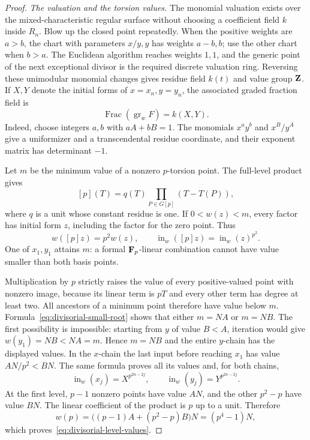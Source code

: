 \begin{proof}
\emph{The valuation and the torsion values.}
The monomial valuation exists over the mixed-characteristic regular surface without choosing a coefficient field $k$ inside $R_n$. Blow up the closed point repeatedly. When the positive weights are $a>b$, the chart with parameters $x/y,y$ has weights $a-b,b$; use the other chart when $b>a$. The Euclidean algorithm reaches weights $1,1$, and the generic point of the next exceptional divisor is the required discrete valuation ring. Reversing these unimodular monomial changes gives residue field $k(t)$ and value group $\mathbf Z$. If $X,Y$ denote the initial forms of $x=x_n,y=y_n$, the associated graded fraction field is
\begin{equation}\label{eq:divisorial-graded-field}
 \operatorname{Frac}(\operatorname{gr}_w F)=k(X,Y).
\end{equation}
Indeed, choose integers $a,b$ with $aA+bB=1$. The monomials $x^ay^b$ and $x^B/y^A$ give a uniformizer and a transcendental residue coordinate, and their exponent matrix has determinant $-1$.

Let $m$ be the minimum value of a nonzero $p$-torsion point. The full-level product gives
\[
 [p](T)=q(T)\prod_{P\in G[p]}(T-T(P)),
\]
where $q$ is a unit whose constant residue is one. If $0<w(z)<m$, every factor has initial form $z$, including the factor for the zero point. Thus
\begin{equation}\label{eq:divisorial-small-root}
 w([p]z)=p^2w(z),\qquad
 \operatorname{in}_w([p]z)=\operatorname{in}_w(z)^{p^2}.
\end{equation}
One of $x_1,y_1$ attains $m$: a formal $\mathbf F_p$-linear combination cannot have value smaller than both basis points.

Multiplication by $p$ strictly raises the value of every positive-valued point with nonzero image, because its linear term is $pT$ and every other term has degree at least two. All ancestors of a minimum point therefore have value below $m$. Formula~\eqref{eq:divisorial-small-root} shows that either $m=NA$ or $m=NB$. The first possibility is impossible: starting from $y$ of value $B<A$, iteration would give $w(y_1)=NB<NA=m$. Hence $m=NB$ and the entire $y$-chain has the displayed values. In the $x$-chain the last input before reaching $x_1$ has value $AN/p^2<BN$. The same formula proves all its values and, for both chains,
\[
 \operatorname{in}_w(x_j)=X^{p^{2n-2j}},
 \qquad \operatorname{in}_w(y_j)=Y^{p^{2n-2j}}.
\]
At the first level, $p-1$ nonzero points have value $AN$, and the other $p^2-p$ have value $BN$. The linear coefficient of the product is $p$ up to a unit. Therefore
\[
 w(p)=\bigl((p-1)A+(p^2-p)B\bigr)N=(p^4-1)N,
\]
which proves~\eqref{eq:divisorial-level-values}.


\end{proof}
